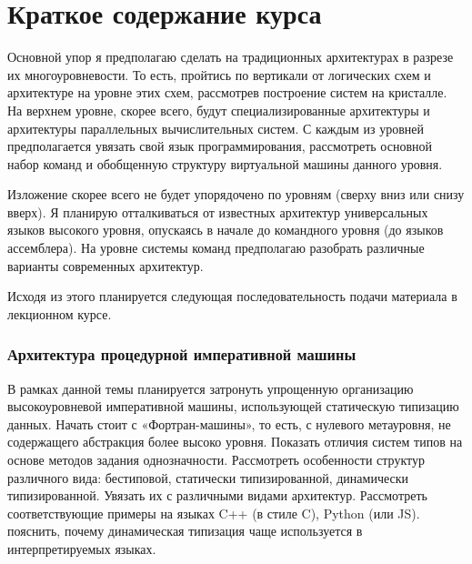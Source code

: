 \section*{Краткое содержание курса}

\begin{center}
\end{center}

Основной упор я предполагаю сделать на традиционных архитектурах в разрезе их многоуровневости. То есть, пройтись по вертикали от логических схем и архитектуре на уровне этих схем, рассмотрев построение систем на кристалле. На верхнем уровне, скорее всего, будут специализированные архитектуры и архитектуры параллельных вычислительных систем. С каждым из уровней предполагается увязать свой язык программирования, рассмотреть основной набор команд и обобщенную структуру виртуальной машины данного уровня.

Изложение скорее всего не будет упорядочено по уровням (сверху вниз или снизу вверх). Я планирую отталкиваться от известных архитектур универсальных языков высокого уровня, опускаясь в начале до командного уровня (до языков ассемблера). На уровне системы команд предполагаю разобрать различные варианты современных архитектур.

Исходя из этого планируется следующая последовательность подачи материала в лекционном курсе.

\subsubsection*{Архитектура процедурной императивной машины}

В рамках данной темы планируется затронуть упрощенную организацию высокоуровневой императивной машины, использующей статическую типизацию данных. Начать стоит с «Фортран-машины», то есть, с нулевого метауровня, не содержащего абстракция более высоко уровня. Показать отличия систем типов на основе методов задания однозначности. Рассмотреть особенности структур различного вида: бестиповой, статически типизированной, динамически типизированной. Увязать их с различными видами архитектур. Рассмотреть соответствующие примеры на языках C++ (в стиле C), Python (или JS). пояснить, почему динамическая типизация чаще используется в интерпретируемых языках.


